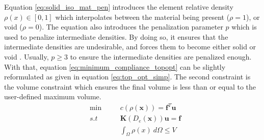 Equation \ref{eq:solid_iso_mat_pen} introduces the element relative density $\rho(x) \in [0,1]$ which interpolates between the material being present ($\rho=1$), or void ($\rho=0$). The equation also introduces the penalization parameter $p$ which is used to penalize intermediate densities. By doing so, it ensures that the intermediate densities are undesirable, and forces them to become either solid or void \cite{Bendsøe_2004}. Usually, $p\geq 3$ to ensure the intermediate densities are penalized enough. With that, equation \ref{eq:minimum_compliance_topopt} can be slightly reformulated as given in equation \ref{eq:top_opt_simp}. The second constraint is the volume constraint which ensures the final volume is less than or equal to the user-defined maximum volume.
\begin{equation}
    \begin{alignedat}{2}
        &\min \quad &&c(\rho(\mathbf{x}))=\mathbf{f}^T\mathbf{u} \\
        & s.t \quad &&\mathbf{K}(D_e(\mathbf{x}))\mathbf{u}=\mathbf{f} \\ 
        & && \int_\Omega \rho(x) \ d\Omega \leq V
    \end{alignedat}
    \label{eq:top_opt_simp}
\end{equation}

